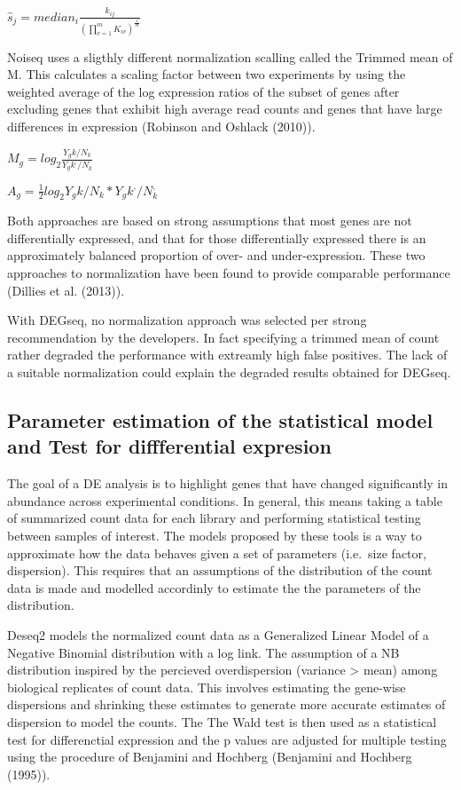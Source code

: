 \documentclass[]{article}
\begin{document}
\(\hat{s}_j = median_i \frac{k_{ij} } {(\prod_{v = 1}^{m}K_{iv})^ \frac{1}{m}}\)

Noiseq uses a sligthly different normalization scalling called the
Trimmed mean of M. This calculates a scaling factor between two
experiments by using the weighted average of the log expression ratios
of the subset of genes after excluding genes that exhibit high average
read counts and genes that have large differences in expression
(Robinson and Oshlack (2010)).

\(M_g = log_2 \frac{Y_gk/N_k} {Y_gk^,/N_k^,}\)

\(A_g = \frac{1}{2}log_2 {Y_gk/N_k}*{Y_gk^,/N_k^,}\)

Both approaches are based on strong assumptions that most genes are not
differentially expressed, and that for those differentially expressed
there is an approximately balanced proportion of over- and
under-expression. These two approaches to normalization have been found
to provide comparable performance (Dillies et al. (2013)).

With DEGseq, no normalization approach was selected per strong
recommendation by the developers. In fact specifying a trimmed mean of
count rather degraded the performance with extreamly high false
positives. The lack of a suitable normalization could explain the
degraded results obtained for DEGseq.

\hypertarget{parameter-estimation-of-the-statistical-model-and-test-for-diffferential-expresion}{%
\subsection{Parameter estimation of the statistical model and Test for
diffferential
expresion}\label{parameter-estimation-of-the-statistical-model-and-test-for-diffferential-expresion}}

The goal of a DE analysis is to highlight genes that have changed
significantly in abundance across experimental conditions. In general,
this means taking a table of summarized count data for each library and
performing statistical testing between samples of interest. The models
proposed by these tools is a way to approximate how the data behaves
given a set of parameters (i.e.~size factor, dispersion). This requires
that an assumptions of the distribution of the count data is made and
modelled accordinly to estimate the the parameters of the distribution.

Deseq2 models the normalized count data as a Generalized Linear Model of
a Negative Binomial distribution with a log link. The assumption of a NB
distribution inspired by the percieved overdispersion (variance
\textgreater{} mean) among biological replicates of count data. This
involves estimating the gene-wise dispersions and shrinking these
estimates to generate more accurate estimates of dispersion to model the
counts. The The Wald test is then used as a statistical test for
differenctial expression and the p values are adjusted for multiple
testing using the procedure of Benjamini and Hochberg (Benjamini and
Hochberg (1995)).
\end{document}
